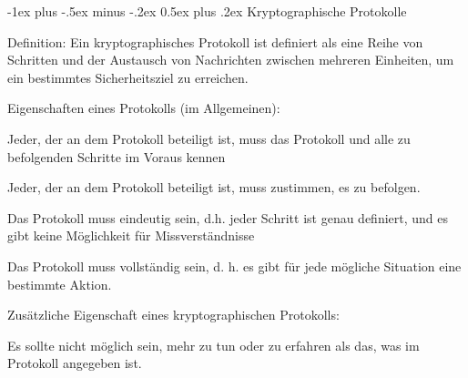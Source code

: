 \documentclass[a4paper]{article}
\makeatletter
\renewcommand{\section}{\@startsection{section}{1}{0mm}%
 {-1ex plus -.5ex minus -.2ex}%
 {0.5ex plus .2ex}%
 {\normalfont\large\bfseries}}
\makeatother
\begin{document}
\begin{multicols}{3}
      \section{Kryptographische Protokolle}
      \begin{itemize*}
            \item Definition: Ein kryptographisches Protokoll ist definiert als eine
            Reihe von Schritten und der Austausch von Nachrichten zwischen
            mehreren Einheiten, um ein bestimmtes Sicherheitsziel zu erreichen.
            \item Eigenschaften eines Protokolls (im Allgemeinen):
            \begin{itemize*}
                  \item Jeder, der an dem Protokoll beteiligt ist, muss das Protokoll und alle zu befolgenden Schritte im Voraus kennen
                  \item Jeder, der an dem Protokoll beteiligt ist, muss zustimmen, es zu befolgen.
                  \item Das Protokoll muss eindeutig sein, d.h. jeder Schritt ist genau definiert, und es gibt keine Möglichkeit für Missverständnisse
                  \item Das Protokoll muss vollständig sein, d. h. es gibt für jede mögliche Situation eine bestimmte Aktion.
            \end{itemize*}
            \item Zusätzliche Eigenschaft eines kryptographischen Protokolls:
            \begin{itemize*}
                  \item Es sollte nicht möglich sein, mehr zu tun oder zu erfahren als das, was im Protokoll angegeben ist.
            \end{itemize*}
      \end{itemize*}


\end{multicols}
\end{document}
